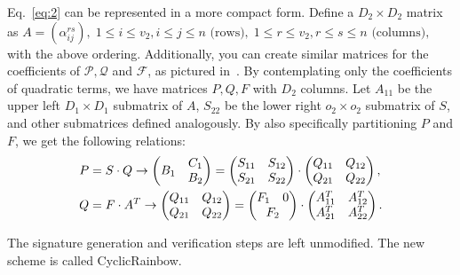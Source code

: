 \documentclass[a4paper, 14pt]{extarticle}
\begin{document}
Eq.~\ref{eq:2} can be represented in a more compact form. Define a $D_{2} \times D_{2}$ matrix as
$
    A = (\alpha_{ij}^{rs}),\; 1 \leq i \leq v_{2}, i \leq j \leq n \text{ (rows)},\; 1 \leq r \leq v_{2}, r \leq s \leq n \text{ (columns)},
$
with the above ordering. Additionally, you can create similar matrices for the coefficients of $\mathcal{P}, \mathcal{Q}$ and $\mathcal{F}$, as pictured in~\cite[Figure 7.5]{Petzoldt:phd:2013:jul}. By contemplating only the coefficients of quadratic terms, we have matrices $P, Q, F$ with $D_{2}$ columns. Let $A_{11}$ be the upper left $D_{1} \times D_{1}$ submatrix of $A$, $S_{22}$ be the lower right $o_{2} \times o_{2}$ submatrix of $S$, and other submatrices defined analogously. By also specifically partitioning $P$ and $F$, we get the following relations:
\begin{align}
    P &= S \cdot Q \rightarrow
    \begin{pmatrix}
        B_{1} & \begin{matrix} C_{1} \\ B_{2} \end{matrix} \\
    \end{pmatrix} =
    \begin{pmatrix}
        S_{11} & S_{12} \\
        S_{21} & S_{22}
    \end{pmatrix} \cdot
    \begin{pmatrix}
        Q_{11} & Q_{12} \\
        Q_{21} & Q_{22}
    \end{pmatrix}, \\
    Q &= F \cdot A^{T} \rightarrow
    \begin{pmatrix}
        Q_{11} & Q_{12} \\
        Q_{21} & Q_{22}
    \end{pmatrix} =
    \begin{pmatrix}
        F_{1} & 0 \\
        \multicolumn{2}{c}{F_{2}}
    \end{pmatrix} \cdot
    \begin{pmatrix}
        A_{11}^{T} & A_{12}^{T} \\
        A_{21}^{T} & A_{22}^{T}
    \end{pmatrix}.
\end{align}



The signature generation and verification steps are left unmodified. The new scheme is called CyclicRainbow.
\end{document}
